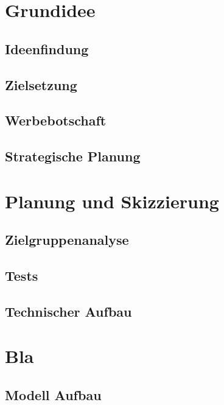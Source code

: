 







\tableofcontents
\clearpage



\section{Grundidee}
\subsection{Ideenfindung}
\subsection{Zielsetzung}
\subsection{Werbebotschaft}
\subsection{Strategische Planung}

\section{Planung und Skizzierung}
\subsection{Zielgruppenanalyse}
\subsection{Tests}
\subsection{Technischer Aufbau}

\section{Bla}

\subsection{Modell Aufbau}
\newpage



